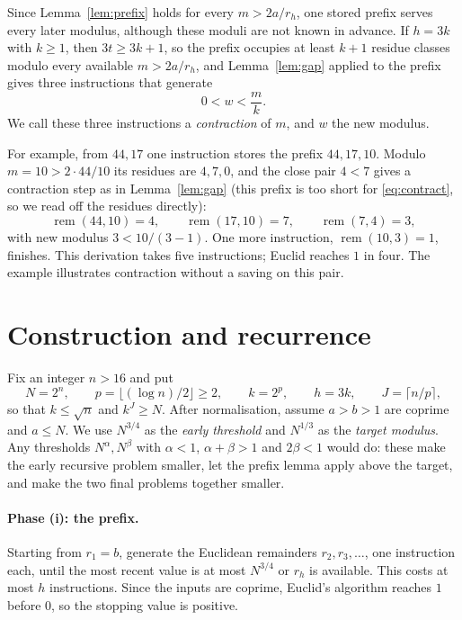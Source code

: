 \documentclass[11pt]{article}
\theoremstyle{remark}
\newcommand{\rem}{\operatorname{rem}}
\begin{document}
Since Lemma~\ref{lem:prefix} holds for every $m>2a/r_h$, one stored prefix
serves every later modulus, although these moduli are not known in advance.
If $h=3k$ with $k\geq1$, then $3t\geq3k+1$, so the prefix occupies at least
$k+1$ residue classes modulo every available $m>2a/r_h$, and
Lemma~\ref{lem:gap} applied to the prefix gives three instructions that
generate
\begin{equation}\label{eq:contract}
0<w<\frac mk.
\end{equation}
We call these three instructions a \emph{contraction} of $m$, and $w$ the new
modulus.

For example, from $44,17$ one instruction stores the prefix $44,17,10$.
Modulo $m=10>2\cdot44/10$ its residues are $4,7,0$, and the close pair
$4<7$ gives a contraction step as in Lemma~\ref{lem:gap} (this prefix is too
short for \eqref{eq:contract}, so we read off the residues directly):
\[
\rem(44,10)=4,\qquad \rem(17,10)=7,\qquad \rem(7,4)=3,
\]
with new modulus $3<10/(3-1)$. One more
instruction, $\rem(10,3)=1$, finishes. This derivation takes five instructions;
Euclid reaches $1$ in four. The example illustrates contraction without a
saving on this pair.

\section{Construction and recurrence}\label{sec:construction}
Fix an integer $n>16$ and put
\[
N=2^n,\qquad p=\lfloor(\log n)/2\rfloor\geq2,\qquad k=2^p,\qquad h=3k,
\qquad J=\lceil n/p\rceil,
\]
so that $k\leq\sqrt n$ and $k^J\geq N$.
After normalisation, assume $a>b>1$ are coprime and $a\leq N$.
We use $N^{3/4}$ as the \emph{early threshold} and $N^{1/3}$ as the
\emph{target modulus}. Any thresholds $N^\alpha,N^\beta$ with $\alpha<1$,
$\alpha+\beta>1$ and $2\beta<1$ would do: these make the early recursive
problem smaller, let the prefix lemma apply above the target, and make the
two final problems together smaller.

\paragraph{Phase (i): the prefix.}
Starting from $r_1=b$, generate the Euclidean remainders $r_2,r_3,\ldots$,
one instruction each, until the most recent value is at most $N^{3/4}$ or
$r_h$ is available. This costs at most $h$ instructions. Since the inputs
are coprime, Euclid's algorithm reaches $1$ before $0$, so the stopping
value is positive.
\end{document}
